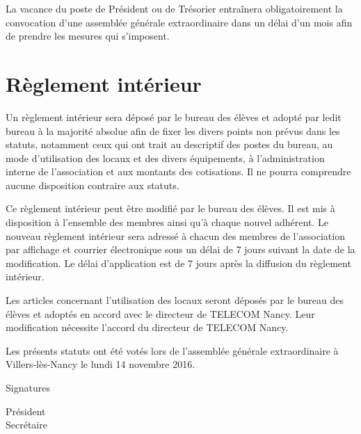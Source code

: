 \documentclass{article}
\begin{document}
				La vacance du poste de Président ou de Trésorier entraînera
				obligatoirement la convocation d’une assemblée générale
				extraordinaire dans un délai d’un mois afin de prendre les
				mesures qui s’imposent.

	\section{Règlement intérieur}
		Un règlement intérieur sera déposé par le bureau des élèves et adopté
		par ledit bureau à la majorité absolue afin de fixer les divers points
		non prévus dans les statuts, notamment ceux qui ont trait au descriptif
		des postes du bureau, au mode d’utilisation des locaux et des divers
		équipements, à l’administration interne de l’association et aux montants
		des cotisations. Il ne pourra comprendre aucune disposition contraire
		aux statuts.

		Ce règlement intérieur peut être modifié par le bureau des élèves. Il
		est mis à disposition à l’ensemble des membres ainsi qu’à chaque nouvel
		adhérent. Le nouveau règlement intérieur sera adressé à chacun des
		membres de l'association par affichage et courrier électronique sous un
		délai de 7 jours suivant la date de la modification. Le délai
		d’application est de 7 jours après la diffusion du règlement intérieur.

		Les articles concernant l’utilisation des locaux seront déposés par le
		bureau des élèves et adoptés en accord avec le directeur de TELECOM
		Nancy. Leur modification nécessite l’accord du directeur de TELECOM
		Nancy.

	\vspace*{5cm}
	\begin{center}
		{\large\light{} Les présents statuts ont été votés lors de l’assemblée
		générale extraordinaire à Villers-lès-Nancy le lundi 14 novembre 2016.}
	\end{center}
    \vspace{3cm}
	Signatures\par
	\begin{multicols}{2}
	    \begin{center}
	        Président \\
	        Secrétaire
	    \end{center}
	\end{multicols}
    
\end{document}
